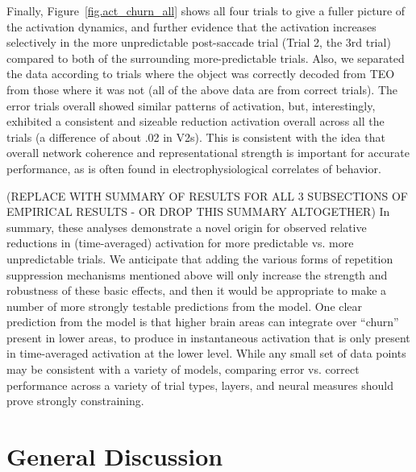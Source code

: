 \documentclass[11pt,twoside]{article}
\newif\myifpdf
\begin{document}
Finally, Figure~\ref{fig.act_churn_all} shows all four trials to give a fuller picture of the activation dynamics, and further evidence that the activation increases selectively in the more unpredictable post-saccade trial (Trial 2, the 3rd trial) compared to both of the surrounding more-predictable trials.  Also, we separated the data according to trials where the object was correctly decoded from TEO from those where it was not (all of the above data are from correct trials).  The error trials overall showed similar patterns of activation, but, interestingly, exhibited a consistent and sizeable reduction activation overall across all the trials (a difference of about .02 in V2s).  This is consistent with the idea that overall network coherence and representational strength is important for accurate performance, as is often found in electrophysiological correlates of behavior.

(REPLACE WITH SUMMARY OF RESULTS FOR ALL 3 SUBSECTIONS OF EMPIRICAL RESULTS - OR DROP THIS SUMMARY ALTOGETHER) In summary, these analyses demonstrate a novel origin for observed relative reductions in (time-averaged) activation for more predictable vs. more unpredictable trials.  We anticipate that adding the various forms of repetition suppression mechanisms mentioned above will only increase the strength and robustness of these basic effects, and then it would be appropriate to make a number of more strongly testable predictions from the model.  One clear prediction from the model is that higher brain areas can integrate over ``churn'' present in lower areas, to produce in instantaneous activation that is only present in time-averaged activation at the lower level.  While any small set of data points may be consistent with a variety of models, comparing error vs. correct performance across a variety of trial types, layers, and neural measures should prove strongly constraining.

\section{General Discussion}
\end{document}
